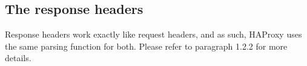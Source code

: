 
\pagebreak[3]
\subsection{The response headers}

Response headers work exactly like request headers, and as such, HAProxy uses
the same parsing function for both. Please refer to paragraph 1.2.2 for more
details.



